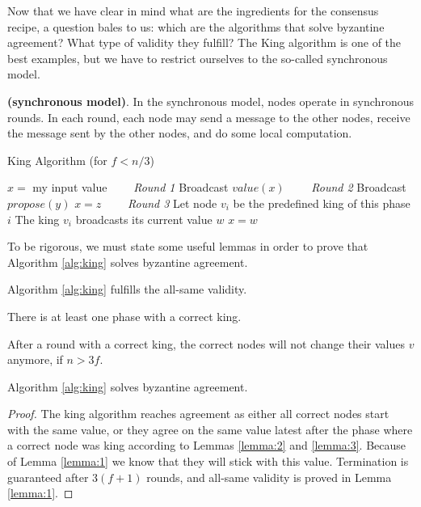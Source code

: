 \bigskip
\noindent
Now that we have clear in mind what are the ingredients for the consensus recipe, a question bales to us: which are the algorithms that solve byzantine agreement? What type of validity they fulfill? The King algorithm is one of the best examples, but we have to restrict ourselves to the so-called synchronous model.
\begin{mydef}{\bf (synchronous model)}.
    In the synchronous model, nodes operate in synchronous rounds. In each round, each node may send a message to the other nodes, receive the message sent by the other nodes, and do some local computation.
\end{mydef}

\begin{algorithm}
	\caption{King Algorithm (for $f<n/3$)}
	\label{alg:king}
	\begin{algorithmic}[1]
		\State $x =$ my input value
		\Statex \ \ \ \ \textit{Round 1}
		\State Broadcast $value(x)$
		\Statex \ \ \ \ \textit{Round 2}
		\State Broadcast $propose(y)$
		\EndIf 
		\State $x=z$
		\EndIf
		\Statex \ \ \ \ \textit{Round 3}
		\State Let node $v_{i}$ be the predefined king of this phase $i$
		\State The king $v_{i}$ broadcasts its current value $w$
		\State $x=w$
		\EndIf
		\EndFor
	\end{algorithmic}
\end{algorithm}

\newpage

\bigskip
\noindent
To be rigorous, we must state some useful lemmas in order to prove that Algorithm \ref{alg:king} solves byzantine agreement.
\begin{mylemma}
    \label{lemma:1}
    Algorithm \ref{alg:king} fulfills the all-same validity.
\end{mylemma}
\begin{mylemma}
    \label{lemma:2}
    There is at least one phase with a correct king.
\end{mylemma}
\begin{mylemma}
    \label{lemma:3}
    After a round with a correct king, the correct nodes will not change their values $v$ anymore, if $n > 3f$.
\end{mylemma}

\begin{thm}
    Algorithm \ref{alg:king} solves byzantine agreement.
\end{thm}
\begin{proof}
    The king algorithm reaches agreement as either all correct nodes start with the same value, or they agree on the same value latest after the phase where a correct node was king according to Lemmas \ref{lemma:2} and \ref{lemma:3}. Because of Lemma \ref{lemma:1} we know that they will stick with this value. Termination is guaranteed after $3(f+1)$ rounds, and all-same validity is proved in Lemma \ref{lemma:1}.
\end{proof}

